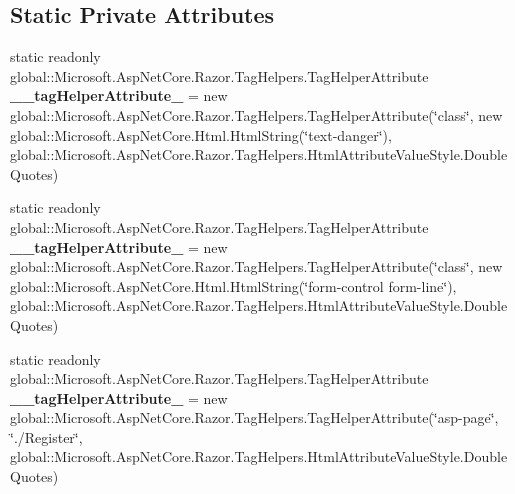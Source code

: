 \subsection*{Static Private Attributes}
\begin{DoxyCompactItemize}
\item 
\mbox{\label{class_projeto_e_s_w_1_1_areas_1_1_identity_1_1_pages_1_1_account_1_1_areas___identity___pages___account___login_aaed010d8dae4743b9cadb5dd557e69ec}} 
static readonly global\+::\+Microsoft.\+Asp\+Net\+Core.\+Razor.\+Tag\+Helpers.\+Tag\+Helper\+Attribute {\bfseries \+\_\+\+\_\+tag\+Helper\+Attribute\+\_} = new global\+::\+Microsoft.\+Asp\+Net\+Core.\+Razor.\+Tag\+Helpers.\+Tag\+Helper\+Attribute(\char`\"{}class\char`\"{}, new global\+::\+Microsoft.\+Asp\+Net\+Core.\+Html.\+Html\+String(\char`\"{}text-\/danger\char`\"{}), global\+::\+Microsoft.\+Asp\+Net\+Core.\+Razor.\+Tag\+Helpers.\+Html\+Attribute\+Value\+Style.\+Double\+Quotes)
\item 
\mbox{\label{class_projeto_e_s_w_1_1_areas_1_1_identity_1_1_pages_1_1_account_1_1_areas___identity___pages___account___login_a9f1c40a316144f672d93b5ecb683a648}} 
static readonly global\+::\+Microsoft.\+Asp\+Net\+Core.\+Razor.\+Tag\+Helpers.\+Tag\+Helper\+Attribute {\bfseries \+\_\+\+\_\+tag\+Helper\+Attribute\+\_} = new global\+::\+Microsoft.\+Asp\+Net\+Core.\+Razor.\+Tag\+Helpers.\+Tag\+Helper\+Attribute(\char`\"{}class\char`\"{}, new global\+::\+Microsoft.\+Asp\+Net\+Core.\+Html.\+Html\+String(\char`\"{}form-\/control form-\/line\char`\"{}), global\+::\+Microsoft.\+Asp\+Net\+Core.\+Razor.\+Tag\+Helpers.\+Html\+Attribute\+Value\+Style.\+Double\+Quotes)
\item 
\mbox{\label{class_projeto_e_s_w_1_1_areas_1_1_identity_1_1_pages_1_1_account_1_1_areas___identity___pages___account___login_a4b5539ad00ad275db990eaf765ce33ae}} 
static readonly global\+::\+Microsoft.\+Asp\+Net\+Core.\+Razor.\+Tag\+Helpers.\+Tag\+Helper\+Attribute {\bfseries \+\_\+\+\_\+tag\+Helper\+Attribute\+\_} = new global\+::\+Microsoft.\+Asp\+Net\+Core.\+Razor.\+Tag\+Helpers.\+Tag\+Helper\+Attribute(\char`\"{}asp-\/page\char`\"{}, \char`\"{}./Register\char`\"{}, global\+::\+Microsoft.\+Asp\+Net\+Core.\+Razor.\+Tag\+Helpers.\+Html\+Attribute\+Value\+Style.\+Double\+Quotes)

\end{DoxyCompactItemize}
